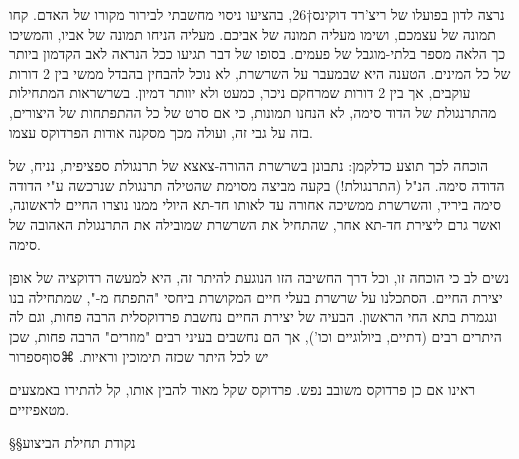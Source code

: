 נרצה לדון בפועלו של ריצ'רד דוקינס†{26}, בהציעו ניסוי מחשבתי לבירור מקורו של האדם. קחו תמונה של עצמכם, ושימו מעליה תמונה של אביכם. מעליה הניחו תמונה של אביו, והמשיכו כך הלאה מספר בלתי-מוגבל של פעמים. בסופו של דבר תגיעו ככל הנראה לאב הקדמון ביותר של כל המינים. הטענה היא שבמעבר על השרשרת, לא נוכל להבחין בהבדל ממשי בין 2 דורות עוקבים, אך בין 2 דורות שמרחקם ניכר, כמעט ולא יוותר דמיון. בשרשראות המתחילות מהתרנגולת של הדוד סימה, לא הנחנו תמונות, כי אם סרט של כל ההתפתחות של היצורים, בזה על גבי זה, ועולה מכך מסקנה אודות הפרדוקס עצמו.
        
הוכחה לכך תוצע כדלקמן: נתבונן בשרשרת ההורה-צאצא של תרנגולת ספציפית, נניח, של הדודה סימה. הנ"ל (התרנגולת!) בקעה מביצה מסוימת שהטילה תרנגולת שנרכשה ע"י הדודה סימה ביריד, והשרשרת ממשיכה אחורה עד לאותו חד-תא היולי ממנו נוצרו החיים לראשונה, ואשר גרם ליצירת חד-תא אחר, שהתחיל את השרשרת שמובילה את התרנגולת האהובה של סימה.
        
        נשים לב כי הוכחה זו, וכל דרך החשיבה הזו הנוגעת להיתר זה, היא למעשה רדוקציה של אופן יצירת החיים. הסתכלנו על שרשרת בעלי חיים המקושרת ביחסי "התפתח מ-", שמתחילה בנו ונגמרת בתא החי הראשון. הבעיה של יצירת החיים נחשבת פרדוקסלית הרבה פחות, וגם לה היתרים רבים (דתיים, ביולוגיים וכו'), אך הם נחשבים בעיני רבים "מוזרים" הרבה פחות, שכן יש לכל היתר שכזה תימוכין וראיות.
⌘סוף{ספרור}
    
    ראינו אם כן פרדוקס משובב נפש. פרדוקס שקל מאוד להבין אותו, קל להתירו באמצעים מטאפיזיים.
    
§§נקודת תחילת הביצוע
    
